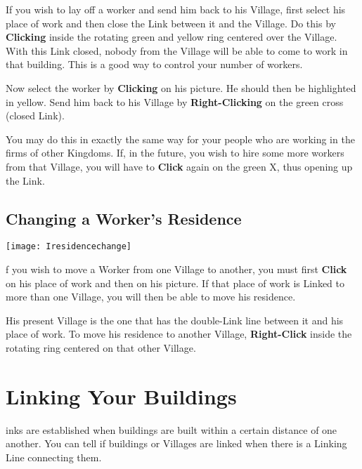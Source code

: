 If you wish to lay off a worker and send him back to his Village, first select his place of work and then close the Link between it and the Village. Do this by \textbf{Clicking} inside the rotating green and yellow ring centered over the Village. With this Link closed, nobody from the Village will be able to come to work in that building. This is a good way to control your number of workers.


Now select the worker by \textbf{Clicking} on his picture. He should then be highlighted in yellow. Send him back to his Village by \textbf{Right-Clicking} on the green cross (closed Link).


You may do this in exactly the same way for your people who are working in the firms of other Kingdoms. If, in the future, you wish to hire some more workers from that Village, you will have to \textbf{Click} again on the green X, thus opening up the Link.

\subsection{Changing a Worker’s Residence}


\begin{center}
	\texttt{[image: Iresidencechange]} %
\end{center}

f you wish to move a Worker from one Village to another, you must first \textbf{Click} on his place of work and then on his picture. If that place of work is Linked to more than one Village, you will then be able to move his residence.


His present Village is the one that has the double-Link line between it and his place of work. To move his residence to another Village, \textbf{Right-Click} inside the rotating ring centered on that other Village.

\section{Linking Your Buildings}


inks are established when buildings are built within a certain distance of one another. You can tell if buildings or Villages are linked when there is a Linking Line connecting them.

